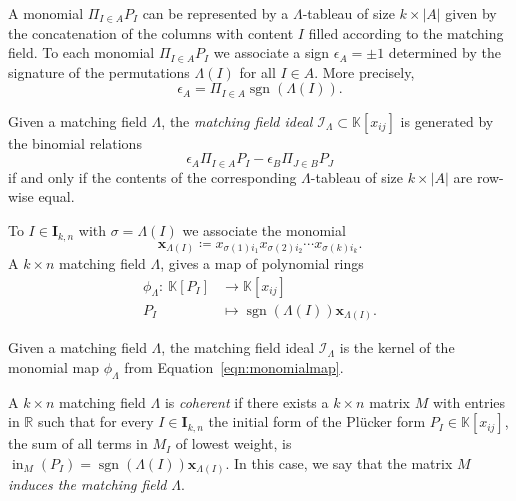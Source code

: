 \documentclass[ALCO,ThmDefs,Unicode,epreuves]{cedram}
\DeclareMathOperator{\ini}{in}
\DeclareMathOperator{\sgn}{sgn}
\begin{document}
A monomial $\Pi_{I \in A} P_I $ can be represented by a $\Lambda$-tableau of size $k \times |A|$ given by the concatenation of the columns with content $I$ filled according to the matching field. 
To each monomial $\Pi_{I \in A} P_I $ we associate a sign $\epsilon_{A} = \pm 1$ determined by the signature of the permutations $\Lambda(I)$ for all $I \in A$. More precisely, 
\[
\epsilon_{A} = \Pi_{I \in A} \sgn (\Lambda(I)).
\]


\begin{Definition}
Given a matching field $\Lambda$, the \emph{matching field ideal} $\mathcal{I}_{\Lambda} \subset \mathbb{K}[x_{ij}]$ is generated by the 
 binomial relations 
\begin{equation}\label{eq:binomials}
\epsilon_A \Pi_{I \in A} P_I - \epsilon_B \Pi_{J \in B} P_J
\end{equation}
if and only if the contents of the corresponding $\Lambda$-tableau of size $k \times |A|$ are row-wise equal.
\end{Definition}

To $I \in \mathbf{I}_{k, n}$ {with $\sigma=\Lambda(I)$} we associate the monomial 
\[ 
\mathbf{x}_{\Lambda(I)}\coloneqq x_{\sigma(1) i_{1}}x_{\sigma(2)i_2}\cdots x_{{\sigma(k)i_k}}. 
 \]
A $k\times n$ matching field $\Lambda$, 
gives a map of polynomial rings 
\begin{equation}\label{eqn:monomialmap}
\begin{aligned}
\phi_{\Lambda} \colon\ \mathbb{K}[P_I] &\rightarrow \mathbb{K}[x_{ij}] 
\\ 
 P_{I} &\mapsto \sgn(\Lambda(I)) \mathbf{x}_{\Lambda(I)}.
\end{aligned}
\end{equation}

\smallskip



\begin{Proposition}
Given a matching field $\Lambda$, the matching field ideal $\mathcal{I}_{\Lambda}$ is the kernel of the monomial map
$\phi_{\Lambda}$ from Equation~\eqref{eqn:monomialmap}. 
\end{Proposition}



\begin{Definition}\label{def:coherent}
A $k \times n$ matching field $\Lambda$ is \emph{coherent} if there exists a $k \times n$ matrix $M$ with entries in $\mathbb{R}$ 
such that 
for every $I \in \mathbf{I}_{k, n}$ 
the initial form of the Pl{\"u}cker form $P_I \in \mathbb{K}[x_{ij}]$, the sum of all terms in $M_I$ of lowest weight, is $\ini_M (P_I) = \sgn (\Lambda(I)) \mathbf{x}_{\Lambda(I)}$. 
In this case, we say that the matrix $M$ \emph{induces the matching field} $\Lambda$. 
\end{Definition}
\end{document}
